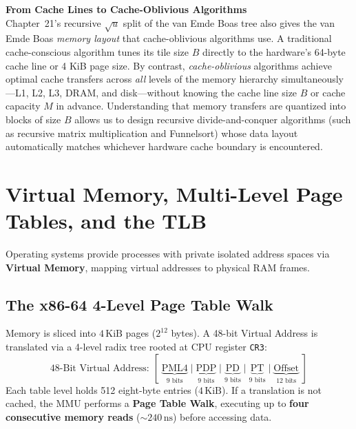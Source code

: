 \begin{connectionbox}
\textbf{From Cache Lines to Cache-Oblivious Algorithms}\\
Chapter~21's recursive $\sqrt{u}$ split of the van Emde Boas tree also gives the
van Emde Boas \emph{memory layout} that cache-oblivious algorithms use. A traditional cache-conscious algorithm tunes its tile size $B$ directly
to the hardware's 64-byte cache line or 4 KiB page size.
By contrast, \emph{cache-oblivious} algorithms achieve optimal cache transfers across
\emph{all} levels of the memory hierarchy simultaneously---L1, L2, L3, DRAM, and disk---without
knowing the cache line size $B$ or cache capacity $M$ in advance.
Understanding that memory transfers are quantized into blocks of size $B$ allows us to
design recursive divide-and-conquer algorithms (such as recursive matrix multiplication
and Funnelsort) whose data layout automatically matches whichever hardware cache
boundary is encountered.
\end{connectionbox}

\chapterline

\section{Virtual Memory, Multi-Level Page Tables, and the TLB}

Operating systems provide processes with private isolated address spaces via
\textbf{Virtual Memory}, mapping virtual addresses to physical RAM frames.

\subsection{The x86-64 4-Level Page Table Walk}

Memory is sliced into $4\,\text{KiB}$ pages ($2^{12}$ bytes). A 48-bit Virtual Address is
translated via a 4-level radix tree rooted at CPU register \texttt{CR3}:
\[
    \text{48-Bit Virtual Address: } [\; \underbrace{\text{PML4}}_{9\text{ bits}} \;\big|\; \underbrace{\text{PDP}}_{9\text{ bits}} \;\big|\; \underbrace{\text{PD}}_{9\text{ bits}} \;\big|\; \underbrace{\text{PT}}_{9\text{ bits}} \;\big|\; \underbrace{\text{Offset}}_{12\text{ bits}} \;]
\]
Each table level holds 512 eight-byte entries ($4\,\text{KiB}$).
If a translation is not cached, the MMU performs a \textbf{Page Table Walk}, executing
up to \textbf{four consecutive memory reads} ($\sim 240\,\text{ns}$) before accessing data.

